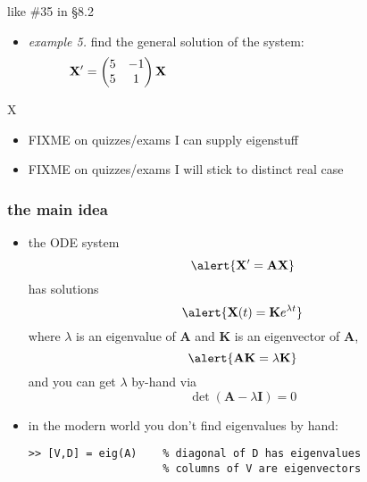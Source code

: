 \documentclass[urlcolor=blue,dvipsnames]{beamer}
\newcommand{\bA}{\mathbf{A}}
\newcommand{\bI}{\mathbf{I}}
\newcommand{\bK}{\mathbf{K}}
\newcommand{\bX}{\mathbf{X}}
\begin{document}
\begin{frame}{like \#35 in \S8.2}

\begin{itemize}
\item \emph{example 5.}  find the general solution of the system:
$$\bX' = \begin{pmatrix} 5 & -1 \\ 5 & 1 \end{pmatrix} \bX \hspace{70mm}$$
\end{itemize}

\vspace{70mm}
\end{frame}


\begin{frame}{X}

\begin{itemize}
\item FIXME  on quizzes/exams I can supply eigenstuff
\item FIXME on quizzes/exams I will stick to distinct real case
\end{itemize}
\end{frame}


\begin{frame}[fragile]
\frametitle{the main idea}

\begin{itemize}
\item the ODE system
    $$\alert{\bX' = \bA \bX}$$
has solutions
    $$\alert{\bX(t) = \bK e^{\lambda t}}$$
where $\lambda$ is an eigenvalue of $\bA$ and $\bK$ is an eigenvector of $\bA$,
    $$\alert{\bA\bK=\lambda \bK}$$
and you can get $\lambda$ by-hand via
    $$\det(\bA - \lambda \bI) = 0$$
\item in the modern world you don't find eigenvalues by hand:
\begin{Verbatim}[fontsize=\small]
>> [V,D] = eig(A)    % diagonal of D has eigenvalues
                     % columns of V are eigenvectors
\end{Verbatim}
\end{itemize}
\end{frame}
\end{document}

